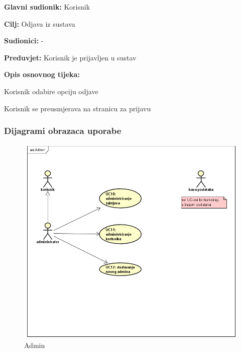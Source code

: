 					\noindent {}
					\begin{packed_item}
						
						\item \textbf{Glavni sudionik: }Korisnik
						\item  \textbf{Cilj:} Odjava iz sustava 
						\item  \textbf{Sudionici:} -
						\item  \textbf{Preduvjet:} Korisnik je prijavljen u sustav
						\item  \textbf{Opis osnovnog tijeka:}
						
						\item[] \begin{packed_enum}
							
							\item Korisnik odabire opciju odjave
							\item Korisnik se preusmjerava na stranicu za prijavu
						\end{packed_enum}
						
					\end{packed_item}
					
					\newpage
			
					
					
				\subsubsection{Dijagrami obrazaca uporabe}
					
					\begin{figure}[H]
					\includegraphics[scale=0.8]{slike/admin.png} %
					\centering
					\caption{Admin}
				\end{figure}
				\newpage
				
